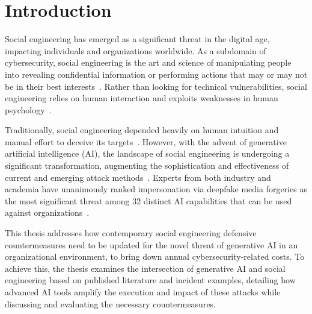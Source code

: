 \chapter{Introduction\label{chapter:intro}}
\begin{comment}
\end{comment}


%
%
Social engineering has emerged as a significant threat in the digital age, impacting individuals and organizations worldwide. As a subdomain of cybersecurity, social engineering is the art and science of manipulating people into revealing confidential information or performing actions that may or may not be in their best interests~\citep{hadnagy_Social_Engineering_The_Science_2018}. Rather than looking for technical vulnerabilities, social engineering relies on human interaction and exploits weaknesses in human psychology~\citep{wang_Defining_Social_Engineering_2020}.





%
%
Traditionally, social engineering depended heavily on human intuition and manual effort to deceive its targets~\citep{mitnick_The_Art_of_Deception_2003, mirsky_Threat_Offensive_AI_Organizations_2023}. However, with the advent of generative artificial intelligence (AI), the landscape of social engineering is undergoing a significant transformation, augmenting the sophistication and effectiveness of current and emerging attack methods~\citep{fakhouri_AI_Driven_Solutions_SE_Attacks_2024, fbi_Internet_Crime_Report_2023}. Experts from both industry and academia have unanimously ranked impersonation via deepfake media forgeries as the most significant threat among 32 distinct AI capabilities that can be used against organizations~\citep{mirsky_Threat_Offensive_AI_Organizations_2023}.







%
%
This thesis addresses how contemporary social engineering defensive countermeasures need to be updated for the novel threat of generative AI in an organizational environment, to bring down annual cybersecurity-related costs. To achieve this, the thesis examines the intersection of generative AI and social engineering based on published literature and incident examples, detailing how advanced AI tools amplify the execution and impact of these attacks while discussing and evaluating the necessary countermeasures.





